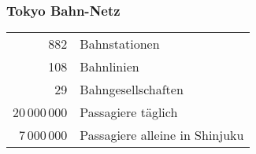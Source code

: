 %
%
%

\begin{frame}
\frametitle{Tokyo Bahn-Netz}
\begin{center}
\begin{tabular}{rl}
882&Bahnstationen\\
108&Bahnlinien\\
29&Bahngesellschaften\\
20\,000\,000&Passagiere täglich\\
7\,000\,000&Passagiere alleine in Shinjuku\\
\end{tabular}
\end{center}
\end{frame}

